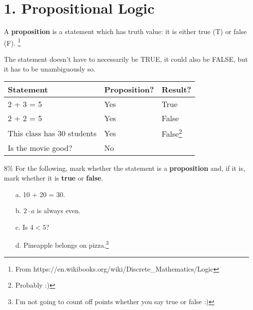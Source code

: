 \documentclass[a4paper,12pt]{book}
\begin{document}
    \section*{1. Propositional Logic}

        \begin{introNOHEAD}
            A \textbf{proposition} is a statement which has truth value: it is either true (T) or false (F).
            \footnote{From https://en.wikibooks.org/wiki/Discrete\_Mathematics/Logic}

            The statement doesn't have to necessarily be TRUE, it could also
            be FALSE, but it has to be unambiguously so. ~\\

            \begin{tabular}{ | l | l | l | }
                \hline
                \textbf{Statement} & \textbf{Proposition?} & \textbf{Result?}
                \\ \hline
                2 + 3 = 5 & Yes & True
                \\ \hline
                2 + 2 = 5 & Yes & False
                \\ \hline
                This class has 30 students & Yes & False\footnote{Probably :)}
                \\ \hline
                Is the movie good? & No &
                \\ \hline
            \end{tabular}
        \end{introNOHEAD}


        \begin{question}{1}{8\%}
            For the following, mark whether the statement is a \textbf{proposition} and,
            if it is, mark whether it is \textbf{true} or \textbf{false}.
        \end{question}

        \begin{enumerate}
            \item[a.] 10 + 20 = 30.
            \item[b.] $2 \cdot a$ is always even.
            \item[c.] Is $4 < 5$?
            \item[d.] Pineapple belongs on pizza.\footnote{I'm not going to count off points whether you say true or false :)}
        \end{enumerate}
\end{document}

